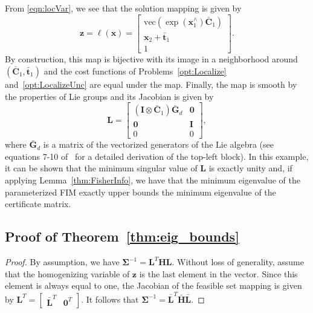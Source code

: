 \documentclass[lettersize,journal]{IEEEtran}
\newcommand{\vect}[1]{\mbox{vec}(#1)}
\begin{document}
{From \eqref{eqn:locVar}, we see that the solution mapping is given by
\begin{equation}
	\bm{z}=\bm{\ell}(\bm{x}) = \begin{bmatrix}
		\vect{\exp(\bm{x}_1^\wedge)\bar{\bm{C}}_1}\\ \bm{x}_2 + \bar{\bm{t}}_1 \\ 1
	\end{bmatrix}.
\end{equation}
By construction, this map is bijective with its image in a neighborhood around $(\bar{\bm{C}}_1, \bar{\bm{t}}_1)$ and the cost functions of Problems~\eqref{opt:Localize} and~\eqref{opt:LocalizeUnc} are equal under the map. Finally, the map is smooth by the properties of Lie groups and its Jacobian is given by
\begin{equation}
	\bm{L} = \begin{bmatrix}
		(\bm{I}\otimes\bar{\bm{C}}_1) \bar{\bm{G}}_d & \bm{0}\\
		\bm{0} & \bm{I}\\
		0 & 0
	\end{bmatrix},
\end{equation}
where $\bar{\bm{G}}_d$ is a matrix of the vectorized generators of the Lie algebra (see equations 7-10 of~\cite{dellaertShonanRotationAveraging2020} for a detailed derivation of the top-left block). In this example, it can be shown that the minimum singular value of $\bm{L}$ is exactly unity and, if applying Lemma~\ref{thm:FisherInfo}, we have that the minimum eigenvalue of the parameterized FIM exactly upper bounds the minimum eigenvalue of the certificate matrix.

\subsection{Proof of Theorem~\ref{thm:eig_bounds}}\label{App:prop1Proof}

\begin{proof}
By assumption, we have $\bm{\Sigma}^{-1} = \bm{L}^T\bm{H}\bm{L}$. Without loss of generality, assume that the homogenizing variable of $\bm{z}$ is the last element in the vector. Since this element is always equal to one, the Jacobian of the feasible set mapping is given by $\bm{L}^T = \begin{bmatrix}
	\bar{\bm{L}}^T & \bm{0}^T
\end{bmatrix}$. It follows that $\bm{\Sigma}^{-1} = \bar{\bm{L}}^T\bar{\bm{H}}\bar{\bm{L}}$.


\end{proof}}
\end{document}
